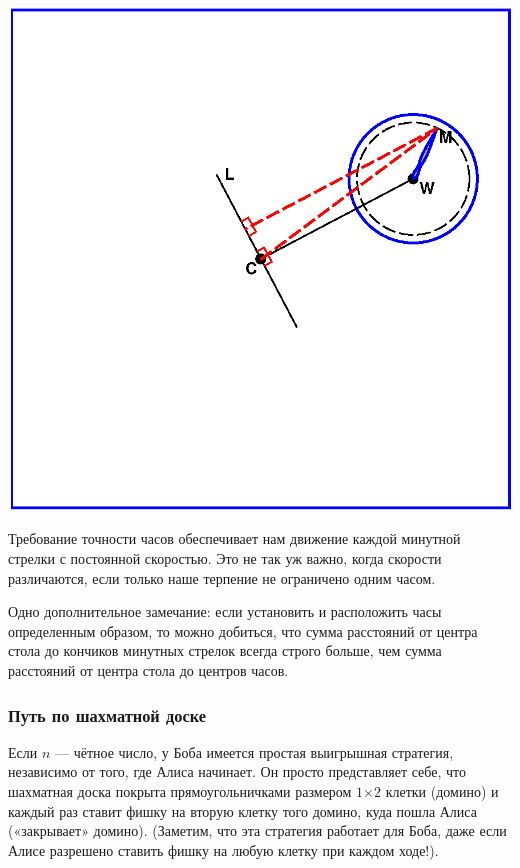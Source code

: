 \begin{center}
\includegraphics[scale=0.6]{Figs/Insight/watch}
\end{center}

Требование точности часов обеспечивает нам движение каждой  минутной стрелки с постоянной скоростью. Это не так уж важно, когда  скорости  различаются, если только наше терпение не ограничено одним часом.


Одно дополнительное замечание: если установить и расположить часы определенным образом,
то можно добиться, что сумма расстояний от центра стола до кончиков  минутных стрелок  всегда строго больше, чем сумма расстояний от центра стола до центров часов.\heart






\subsubsection*{Путь по шахматной доске}    %



Если $n$ --- чётное число, у Боба имеется простая выигрышная стратегия, независимо от того, где Алиса начинает.  
Он просто представляет себе, что шахматная доска покрыта прямоугольничками размером $1{\times2}$ клетки (домино) и каждый раз ставит фишку на вторую клетку того домино, куда пошла Алиса («закрывает» домино). %
(Заметим, что эта стратегия работает для Боба, даже если Алисе разрешено ставить фишку на любую клетку при каждом ходе!).



